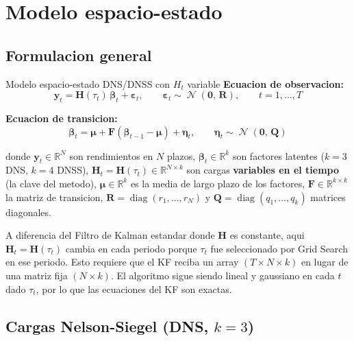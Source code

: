 \documentclass[12pt, a4paper]{article}
\theoremstyle{plain}
\theoremstyle{definition}
\theoremstyle{remark}
\newcommand{\bbet}{\bm{\beta}}
\newcommand{\bmu}{\bm{\mu}}
\newcommand{\beps}{\bm{\varepsilon}}
\newcommand{\by}{\mathbf{y}}
\newcommand{\bH}{\mathbf{H}}
\newcommand{\bF}{\mathbf{F}}
\newcommand{\bQ}{\mathbf{Q}}
\newcommand{\bR}{\mathbf{R}}
\newcommand{\bzero}{\mathbf{0}}
\DeclareMathOperator{\N}{\mathcal{N}}
\newcommand{\diag}{\operatorname{diag}}
\begin{document}
\section{Modelo espacio-estado}
\label{sec:modelo}

\subsection{Formulacion general}

\begin{teoremabox}{Modelo espacio-estado DNS/DNSS con $H_t$ variable}
\textbf{Ecuacion de observacion:}
\begin{equation}
  \by_t = \bH(\tau_t)\,\bbet_t + \beps_t, \qquad
  \beps_t \sim \N(\bzero,\,\bR),
  \qquad t = 1,\ldots,T
  \label{eq:obs}
\end{equation}

\textbf{Ecuacion de transicion:}
\begin{equation}
  \bbet_t = \bmu + \bF(\bbet_{t-1} - \bmu) + \bm{\eta}_t, \qquad
  \bm{\eta}_t \sim \N(\bzero,\,\bQ)
  \label{eq:trans}
\end{equation}

donde $\by_t \in \mathbb{R}^N$ son rendimientos en $N$ plazos,
$\bbet_t \in \mathbb{R}^k$ son factores latentes ($k=3$ DNS, $k=4$ DNSS),
$\bH_t = \bH(\tau_t) \in \mathbb{R}^{N \times k}$ son cargas
\textbf{variables en el tiempo} (la clave del metodo),
$\bmu \in \mathbb{R}^k$ es la media de largo plazo de los factores,
$\bF \in \mathbb{R}^{k \times k}$ la matriz de transicion,
$\bR = \diag(r_1,\ldots,r_N)$ y $\bQ = \diag(q_1,\ldots,q_k)$ matrices diagonales.
\end{teoremabox}

\begin{notabox}
A diferencia del Filtro de Kalman estandar donde $\bH$ es constante,
aqui $\bH_t = \bH(\tau_t)$ cambia en cada periodo porque $\tau_t$ fue
seleccionado por Grid Search en ese periodo. Esto requiere que el KF reciba
un array $(T \times N \times k)$ en lugar de una matriz fija $(N \times k)$.
El algoritmo sigue siendo lineal y gaussiano en cada $t$ dado $\tau_t$,
por lo que las ecuaciones del KF son exactas.
\end{notabox}

\subsection{Cargas Nelson-Siegel (DNS, $k=3$)}
\end{document}

